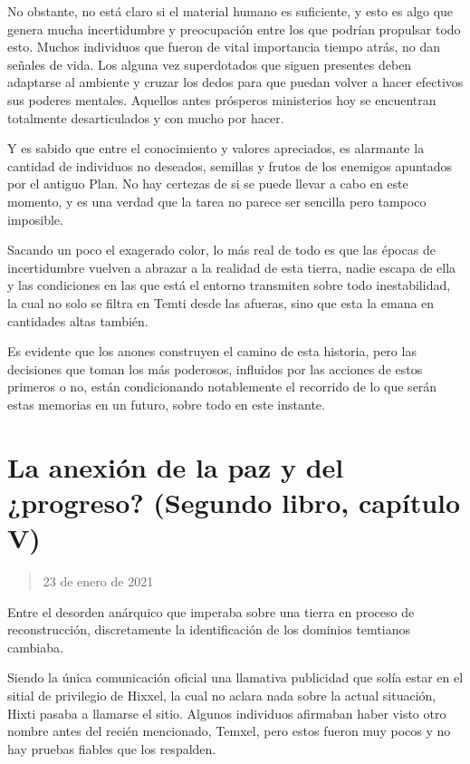 \documentclass[
]{book}
\begin{document}
No obstante, no está claro si el material humano es suficiente, y esto es algo que genera mucha incertidumbre y preocupación entre los que podrían propulsar todo esto. Muchos individuos que fueron de vital importancia tiempo atrás, no dan señales de vida. Los alguna vez superdotados que siguen presentes deben adaptarse al ambiente y cruzar los dedos para que puedan volver a hacer efectivos sus poderes mentales. Aquellos antes prósperos ministerios hoy se encuentran totalmente desarticulados y con mucho por hacer.

Y es sabido que entre el conocimiento y valores apreciados, es alarmante la cantidad de individuos no deseados, semillas y frutos de los enemigos apuntados por el antiguo Plan. No hay certezas de si se puede llevar a cabo en este momento, y es una verdad que la tarea no parece ser sencilla pero tampoco imposible.

Sacando un poco el exagerado color, lo más real de todo es que las épocas de incertidumbre vuelven a abrazar a la realidad de esta tierra, nadie escapa de ella y las condiciones en las que está el entorno transmiten sobre todo inestabilidad, la cual no solo se filtra en Temti desde las afueras, sino que esta la emana en cantidades altas también.

Es evidente que los anones construyen el camino de esta historia, pero las decisiones que toman los más poderosos, influidos por las acciones de estos primeros o no, están condicionando notablemente el recorrido de lo que serán estas memorias en un futuro, sobre todo en este instante.

\hypertarget{la-anexiuxf3n-de-la-paz-y-del-progreso-segundo-libro-capuxedtulo-v}{%
\section{La anexión de la paz y del ¿progreso? (Segundo libro, capítulo V)}\label{la-anexiuxf3n-de-la-paz-y-del-progreso-segundo-libro-capuxedtulo-v}}

\begin{quote}
23 de enero de 2021
\end{quote}

Entre el desorden anárquico que imperaba sobre una tierra en proceso de reconstrucción, discretamente la identificación de los dominios temtianos cambiaba.

Siendo la única comunicación oficial una llamativa publicidad que solía estar en el sitial de privilegio de Hixxel, la cual no aclara nada sobre la actual situación, Hixti pasaba a llamarse el sitio. Algunos individuos afirmaban haber visto otro nombre antes del recién mencionado, Temxel, pero estos fueron muy pocos y no hay pruebas fiables que los respalden.
\end{document}
